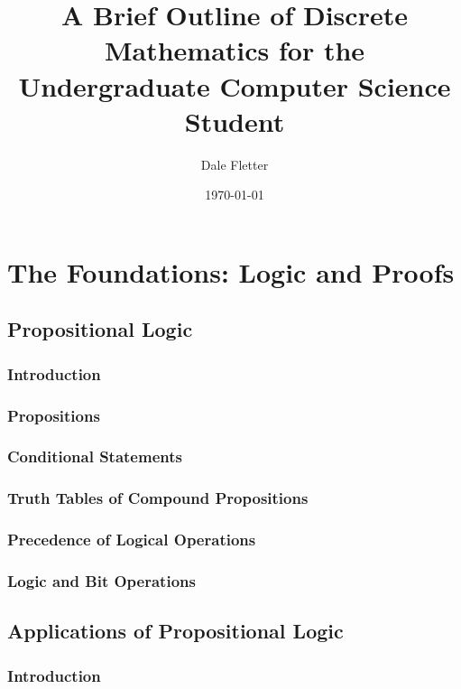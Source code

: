 \documentclass[11pt]{book}
\begin{document}
\thispagestyle{empty}
\title{A Brief Outline of Discrete Mathematics for the Undergraduate Computer Science Student}
\author{Dale Fletter}
\date{\today} %
\maketitle
\frontmatter 
\tableofcontents
\mainmatter



\chapter{The Foundations: Logic and Proofs}
 \section{Propositional Logic}
  \subsection{Introduction}
  \subsection{Propositions}
  \subsection{Conditional Statements}
  \subsection{Truth Tables of Compound Propositions}
  \subsection{Precedence of Logical Operations}
  \subsection{Logic and Bit Operations}
  
 \section{Applications of Propositional Logic}
  \subsection{Introduction}
\end{document}
